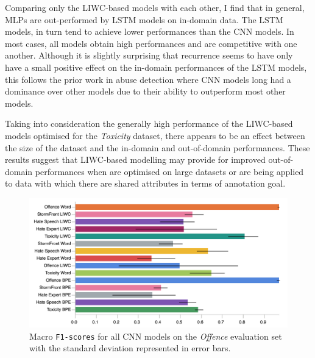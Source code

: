 Comparing only the LIWC-based models with each other, I find that in general, MLPs are out-performed by LSTM models on in-domain data.  
The LSTM models, in turn tend to achieve lower performances than the CNN models.  
In most cases, all models obtain high performances and are competitive with one another.  
Although it is slightly surprising that recurrence seems to have only have a small positive effect on the in-domain performances of the LSTM models, this follows the prior work in abuse detection where CNN models long had a dominance over other models due to their ability to outperform most other models.  
  
Taking into consideration the generally high performance of the LIWC-based models optimised for the \textit{Toxicity} dataset, there appears to be an effect between the size of the dataset and the in-domain and out-of-domain performances.  
These results suggest that LIWC-based modelling may provide for improved out-of-domain performances when  are optimised on large datasets or  are being applied to data with which there are shared attributes in terms of annotation goal.  
  
\begin{figure}  
\centering  
    \includegraphics[width=\textwidth]{all_cnn_davidson_test.pdf}  
    \caption{Macro \texttt{F1-scores} for all CNN models on the \textit{Offence} evaluation set with the standard deviation represented in error bars.}  
    \label{fig:davidson_cnn_test}  
\end{figure}  
  
